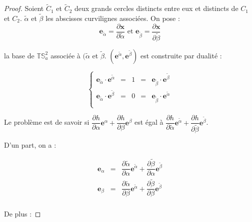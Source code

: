 \begin{proof}
Soient $\tilde{C}_1$ et $\tilde{C}_2$ deux grands cercles distincts entre eux et distincts de $C_1$ et $C_2$. $\tilde{\alpha}$ et $\tilde{\beta}$ les abscisses curvilignes associées. On pose :
\begin{equation}
\mathbf{e}_{\tilde{\alpha}} = \dfrac{\partial \mathbf{x}}{\partial \tilde{\alpha}} \text{ et } \mathbf{e}_{\tilde{\beta}} = \dfrac{\partial \mathbf{x}}{\partial \tilde{\beta}}
\end{equation}

la base de $\mathbb{T}\mathbb{S}_a^2$ associée à $(\tilde{\alpha}$ et $\tilde{\beta}$. $\left( \mathbf{e}^{\tilde{\alpha}}, \mathbf{e}^{\tilde{\beta}} \right)$ est construite par dualité :

\begin{equation}
\left\lbrace
\begin{array}{rcccl}
\mathbf{e}_{\tilde{\alpha}} \cdot \mathbf{e}^{\tilde{\alpha}} & = & 1 & = & \mathbf{e}_{\tilde{\beta}} \cdot \mathbf{e}^{\tilde{\beta}} \\
\mathbf{e}_{\tilde{\alpha}} \cdot \mathbf{e}^{\tilde{\beta}} & = & 0 & = & \mathbf{e}_{\tilde{\beta}} \cdot \mathbf{e}^{\tilde{\alpha}} \\
\end{array}
\right.
\end{equation}

Le problème est de savoir si $\dfrac{\partial h}{\partial \alpha} \mathbf{e}^{\alpha} + \dfrac{\partial h}{\partial \beta} \mathbf{e}^{\beta}$ est égal à $\dfrac{\partial h}{\partial \tilde{\alpha}} \mathbf{e}^{\tilde{\alpha}} + \dfrac{\partial h}{\partial \tilde{\beta}} \mathbf{e}^{\tilde{\beta}}$.

D'un part, on a :

\begin{equation}
\begin{array}{rcl}
\mathbf{e}_{\alpha} & = & \dfrac{\partial \tilde{\alpha}}{\partial \alpha} \mathbf{e}^{\tilde{\alpha}} + \dfrac{\partial \tilde{\beta}}{\partial \alpha} \mathbf{e}^{\tilde{\beta}} \\
\mathbf{e}_{\beta} & = & \dfrac{\partial \tilde{\alpha}}{\partial \beta} \mathbf{e}^{\tilde{\alpha}} + \dfrac{\partial \tilde{\beta}}{\partial \beta} \mathbf{e}^{\tilde{\beta}} \\
\end{array}
\end{equation}

De plus :


\end{proof}
